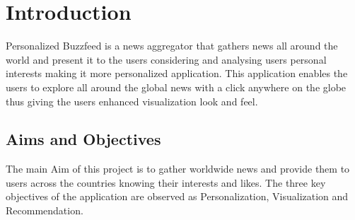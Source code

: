 \chapter{Introduction}

Personalized Buzzfeed is a news aggregator that gathers news all around the world and present it to the users considering and analysing users personal interests making it more personalized application. This application enables the users to explore all around the global news with a click anywhere on the globe thus giving the users enhanced visualization look and feel.

\section{Aims and Objectives}

The main Aim of this project is to gather worldwide news and provide them to users across the countries knowing their interests and likes. The three key objectives of the application are observed as Personalization, Visualization and Recommendation.


